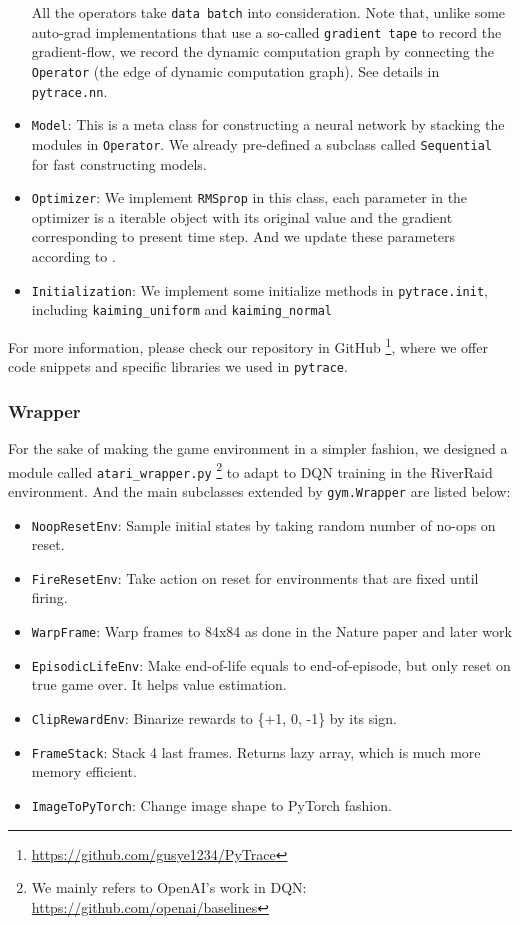 \documentclass[12pt]{article}
\begin{document}
\begin{itemize}
All the operators take \texttt{data batch} into consideration. Note that, unlike some auto-grad implementations that use a so-called \texttt{gradient tape} to record the gradient-flow, we record the dynamic computation graph by connecting the \texttt{Operator} (the edge of dynamic computation graph). See details in \texttt{pytrace.nn}. 
    \item \texttt{Model}: This is a meta class for constructing a neural network by stacking the modules in \texttt{Operator}. We already pre-defined a subclass called \texttt{Sequential} for fast constructing models.
    \item \texttt{Optimizer}: We implement \texttt{RMSprop} in this class, each parameter in the optimizer is a iterable object with its original value and the gradient corresponding to present time step. And we update these parameters according to \cite{hinton}.
    \item \texttt{Initialization}: We implement some initialize methods in \texttt{pytrace.init}, including \texttt{kaiming\_uniform} and \texttt{kaiming\_normal}
\end{itemize}
For more information, please check our repository in GitHub \footnote{\url{https://github.com/gusye1234/PyTrace}}, where we offer code snippets and specific libraries we used in \texttt{pytrace}.

\subsubsection{Wrapper}
For the sake of making the game environment in a simpler fashion, we designed a module called \texttt{atari\_wrapper.py} \footnote{We mainly refers to OpenAI's work in DQN: \url{https://github.com/openai/baselines}} to adapt to DQN training in the RiverRaid environment. And the main subclasses extended by \texttt{gym.Wrapper} are listed below:
\begin{itemize}
    \item \texttt{NoopResetEnv}: Sample initial states by taking random number of no-ops on reset.
    \item \texttt{FireResetEnv}: Take action on reset for environments that are fixed until firing.
    \item \texttt{WarpFrame}: Warp frames to 84x84 as done in the Nature paper and later work
    \item \texttt{EpisodicLifeEnv}: Make end-of-life equals to end-of-episode, but only reset on true game over. It helps value estimation.
    \item \texttt{ClipRewardEnv}: Binarize rewards to \{+1, 0, -1\} by its sign.
    \item \texttt{FrameStack}: Stack 4 last frames. Returns lazy array, which is much more memory efficient.
    \item \texttt{ImageToPyTorch}: Change image shape to PyTorch fashion.
\end{itemize}
\end{document}
